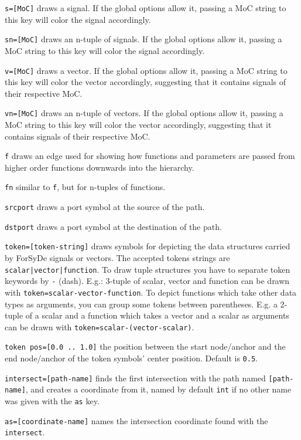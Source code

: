 \begin{optionslist}
\item \texttt{s=[MoC]} draws a signal. If the global options allow it, passing a MoC string to this key will color the signal accordingly. 
\item \texttt{sn=[MoC]} draws an n-tuple of signals. If the global options allow it, passing a MoC string to this key will color the signal accordingly. 
\item \texttt{v=[MoC]} draws a vector. If the global options allow it, passing a MoC string to this key will color the vector accordingly, suggesting that it contains signals of their respective MoC.
\item \texttt{vn=[MoC]} draws an n-tuple of vectors. If the global options allow it, passing a MoC string to this key will color the vector accordingly, suggesting that it contains signals of their respective MoC.
\item \texttt{f} draws an edge used for showing how functions and parameters are passed from higher order functions downwards into the hierarchy.  
\item \texttt{fn} similar to \texttt{f}, but for n-tuples of functions.  
\item \texttt{srcport} draws a port symbol at the source of the path.
\item \texttt{dstport} draws a port symbol at the destination of the path.
\item \texttt{token=[token-string]} draws symbols for depicting the data structures carried by ForSyDe signals or vectors. The accepted tokens strings are \texttt{scalar|vector|function}. To draw tuple structures you have to separate token keywords by \texttt{-} (dash). E.g.: 3-tuple of scalar,  vector and function can be drawn with \texttt{token=scalar-vector-function}. To depict functions which take other data types as arguments, you can group some tokens between parentheses. E.g. a 2-tuple of a scalar and a function which takes a vector and a scalar as arguments can be drawn with \texttt{token=scalar-(vector-scalar)}.
\item \texttt{token pos=[0.0 .. 1.0]} the position between the start node/anchor and the end node/anchor of the token symbols' center position. Default is \texttt{0.5}.
\item \texttt{intersect=[path-name]} finds the first intersection with the path named \texttt{[path-name]}, and creates a coordinate from it, named by default \texttt{int} if no other name was given with the \texttt{as} key.
\item \texttt{as=[coordinate-name]} names the intersection coordinate found with the \texttt{intersect}.

\end{optionslist}
